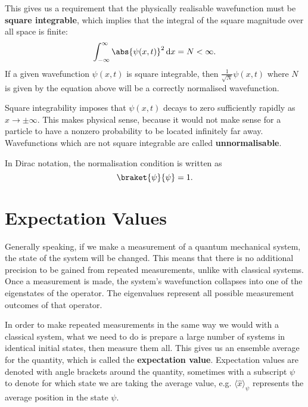 \documentclass[../quantum_mechanics.tex]{subfiles}
\begin{document}
            This gives us a requirement that the physically realisable wavefunction must be \textbf{square integrable}, which implies that the integral of the square magnitude over all space is finite:
            \begin{equation}
                \int_{-\infty}^\infty\abs{\psi(x,t)}^2\dd{x}=N<\infty.
            \end{equation}
            If a given wavefunction $\psi(x,t)$ is square integrable, then $\frac{1}{\sqrt{N}}\psi(x,t)$ where $N$ is given by the equation above will be a correctly normalised wavefunction.
            
            Square integrability imposes that $\psi(x,t)$ decays to zero sufficiently rapidly as $x\to\pm\infty$.
            This makes physical sense, because it would not make sense for a particle to have a nonzero probability to be located infinitely far away.
            Wavefunctions which are not square integrable are called \textbf{unnormalisable}.

            In Dirac notation, the normalisation condition is written as
            \begin{equation}
                \braket{\psi}{\psi}=1.
            \end{equation}

    \section{Expectation Values}\label{sec:expectation-values}
        Generally speaking, if we make a measurement of a quantum mechanical system, the state of the system will be changed.
        This means that there is no additional precision to be gained from repeated measurements, unlike with classical systems.
        Once a measurement is made, the system's wavefunction collapses into one of the eigenstates of the operator.
        The eigenvalues represent all possible measurement outcomes of that operator.
        
        In order to make repeated measurements in the same way we would with a classical system, what we need to do is prepare a large number of systems in identical initial states, then measure them all.
        This gives us an ensemble average for the quantity, which is called the \textbf{expectation value}.
        Expectation values are denoted with angle brackets around the quantity, sometimes with a subscript $\psi$ to denote for which state we are taking the average value, e.g. $\langle\hat{x}\rangle_\psi$ represents the average position in the state $\psi$.
\end{document}
